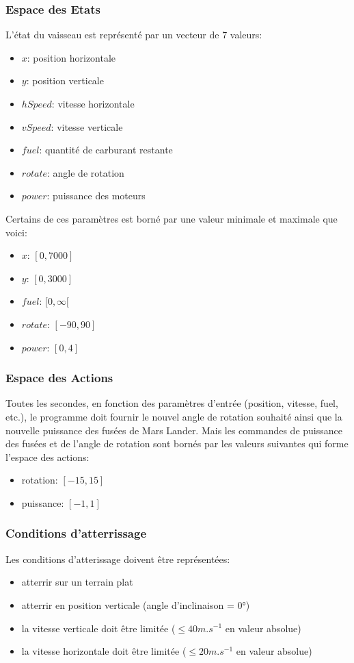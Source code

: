 \documentclass[french,a4paper,10pt,twocolumn]{article}
\begin{document}
\subsubsection{Espace des Etats}

L'état du vaisseau est représenté par un vecteur de 7 valeurs:
\begin{itemize}
    \item $x$: position horizontale
    \item $y$: position verticale
    \item $hSpeed$: vitesse horizontale
    \item $vSpeed$: vitesse verticale
    \item $fuel$: quantité de carburant restante
    \item $rotate$: angle de rotation
    \item $power$: puissance des moteurs
\end{itemize}


Certains de ces paramètres est borné par une valeur minimale et maximale que voici: 

\begin{itemize}
    \item $x$: $[0, 7000]$
    \item $y$: $[0, 3000]$
    \item $fuel$: $ [0, \infty [ $ 
    \item $rotate$: $[-90, 90]$
    \item $power$: $[0, 4]$
\end{itemize}

\subsubsection{Espace des Actions}

Toutes les secondes, en fonction des paramètres d’entrée (position, vitesse, fuel, etc.), 
le programme doit fournir le nouvel angle de rotation souhaité ainsi que la nouvelle puissance des fusées de Mars Lander.
Mais les commandes de puissance des fusées et de l’angle de rotation sont bornés par les valeurs suivantes qui forme l'espace des actions:
\begin{itemize}
    \item rotation: $[-15, 15]$ 
    \item puissance: $[-1, 1]$
\end{itemize}

\subsubsection{Conditions d'atterrissage}
Les conditions d'atterissage doivent être représentées:
\begin{itemize}
    \item atterrir sur un terrain plat
    \item atterrir en position verticale (angle d'inclinaison = 0°)
    \item la vitesse verticale doit être limitée ($\le 40m.s^{-1}$ en valeur absolue)
    \item la vitesse horizontale doit être limitée ($\le 20m.s^{-1}$ en valeur absolue)
\end{itemize}
\end{document}
